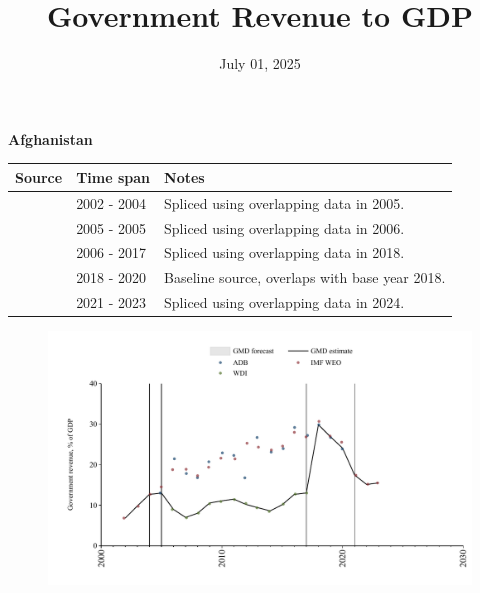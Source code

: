 \documentclass[12pt,a4paper,landscape]{article}
\begin{document}
\title{\Large Government Revenue to GDP}
\date{July 01, 2025}
\maketitle
\thispagestyle{empty}

\clearpage
\setcounter{page}{1}
\hypersetup{colorlinks=true,linkcolor=blue,linktoc=all}
\label{toc}
\tableofcontents
\thispagestyle{empty}
\setcounter{page}{3}
\begin{adjustbox}{max totalsize={\paperwidth}{\paperheight},center}
\begin{minipage}[t][\textheight][t]{\textwidth}
\vspace*{0.5cm}
{}
\begin{center}
{\Large\bfseries Afghanistan}
\end{center}
\vspace{0.5cm}
\begin{table}[H]
\centering
\small
\begin{tabular}{|l|l|l|}
\hline
\textbf{Source} & \textbf{Time span} & \textbf{Notes} \\
\hline
\rowcolor{white}\cite{IMF_WEO}& 2002 - 2004 &Spliced using overlapping data in 2005.\\
\rowcolor{lightgray}\cite{ADB}& 2005 - 2005 &Spliced using overlapping data in 2006.\\
\rowcolor{white}\cite{WDI}& 2006 - 2017 &Spliced using overlapping data in 2018.\\
\rowcolor{lightgray}\cite{ADB}& 2018 - 2020 &Baseline source, overlaps with base year 2018.\\
\rowcolor{white}\cite{IMF_WEO}& 2021 - 2023 &Spliced using overlapping data in 2024.\\
\hline
\end{tabular}
\end{table}
\begin{figure}[H]
\centering
\includegraphics[width=\textwidth,height=0.6\textheight,keepaspectratio]{graphs/AFG_govrev_GDP.pdf}
\end{figure}
\end{minipage}
\end{adjustbox}
\end{document}
